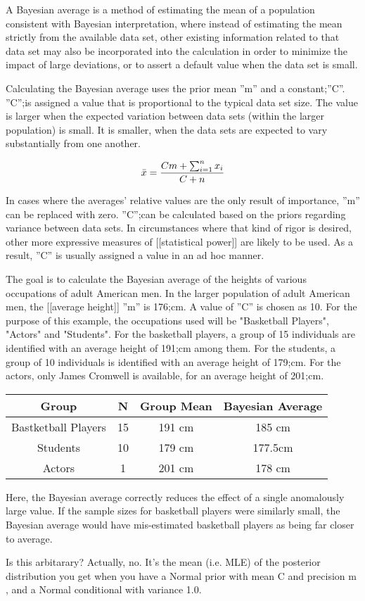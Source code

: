 A Bayesian average is a method of estimating the mean of a population consistent with Bayesian interpretation, where instead of estimating the mean strictly from the available data set, other existing information related to that data set may also be incorporated into the calculation in order to minimize the impact of large deviations, or to assert a default value when the data set is small.

Calculating the Bayesian average uses the prior mean ''m'' and a constant;''C''. ''C'';is assigned a value that is proportional to the typical data set size. The value is larger when the expected variation between data sets (within the larger population) is small. It is smaller, when the data sets are expected to vary substantially from one another.

\[  \bar{x} = {Cm + \sum_{i=1}^n{x_i} \over C + n}  \]

In cases where the averages' relative values are the only result of importance, ''m'' can be replaced with zero. ''C'';can be calculated based on the priors regarding variance between data sets. In circumstances where that kind of rigor is desired, other more expressive measures of [[statistical power]] are likely to be used. As a result, ''C'' is usually assigned a value in an ad hoc manner.

The goal is to calculate the Bayesian average of the heights of various occupations of adult American men. In the larger population of adult American men, the [[average height]] ''m'' is 176;cm. A value of ''C'' is chosen as 10. For the purpose of this example, the occupations used will be "Basketball Players", "Actors" and "Students". For the basketball players, a group of 15 individuals are identified with an average height of 191;cm among them. For the students, a group of 10 individuals is identified with an average height of 179;cm. For the actors, only James Cromwell is available, for an average height of 201;cm.


\begin{tabular}{|c|c|c|c|}
	\hline Group & N & Group Mean & Bayesian Average \\ 
	\hline Bastketball Players & 15 & 191 cm & 185 cm \\ 
	\hline Students & 10 & 179 cm & 177.5cm \\ 
	\hline Actors & 1 & 201 cm & 178 cm \\ 
	\hline 
\end{tabular} 
Here, the Bayesian average correctly reduces the effect of a single anomalously large value. If the sample sizes for basketball players were similarly small, the Bayesian average would have mis-estimated basketball players as being far closer to average.

Is this arbitarary? Actually, no. It’s the mean (i.e. MLE) of the posterior distribution you get when you have a Normal prior with mean C  and precision m , and a Normal conditional with variance 1.0.
